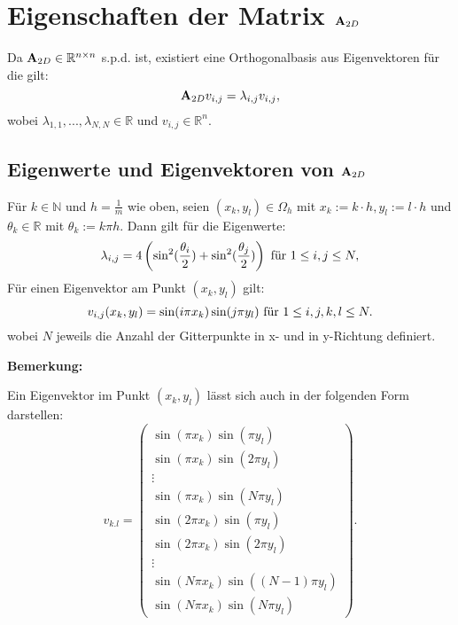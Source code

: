 

\section{Eigenschaften der Matrix ${\textbf{A}}_{2D}$}\label{s.Eigenwerte und Eigenvektoren}

Da ${\textbf{A}}_{2D} \in \mathbb{R}^{n \times n}$ s.p.d. ist, existiert eine Orthogonalbasis aus Eigenvektoren für die gilt:
\begin{equation}
{\textbf{A}}_{2D}v_{i,j} = \lambda_{i,j} v_{i,j},
\end{equation}
wobei $\lambda_{1,1},...,\lambda_{N,N} \in \mathbb{R}$ und $v_{i,j} \in \mathbb{R}^{n}$.

\subsection{Eigenwerte und Eigenvektoren von ${\textbf{A}}_{2D}$}\label{ss.Eigenwerte und Eigenvektoren}

Für $k \in \mathbb{N}$ und $h = \frac {1} {m}$ wie oben, seien $(x_{k},y_{l}) \in \Omega_{h}$ mit $x_{k} := k \cdot h, y_{l} := l \cdot h$ und $\theta_{k} \in \mathbb{R}$ mit $\theta_{k} := k \pi h$. Dann gilt für die Eigenwerte:
\begin{equation}
\lambda_{i,j} = 4 \left(\sin^{2}(\frac {\theta_{i}} {2}) + \sin^{2}(\frac {\theta_{j}} {2}) \right) \textnormal{ für } 1 \le i,j \le N,\label{eq.Eigenwerte}
\end{equation}
Für einen Eigenvektor am Punkt $(x_{k},y_{l})$ gilt:
\begin{equation}
v_{i,j}(x_{k},y_{l}) = \sin(i \pi x_{k}) \sin(j \pi y_{l}) \textnormal{ für } 1 \le i,j,k,l \le N.
\end{equation}
wobei $N$ jeweils die Anzahl der Gitterpunkte in x- und in y-Richtung definiert.

\textbf{Bemerkung:}

Ein Eigenvektor im Punkt $(x_{k},y_{l})$ lässt sich auch in der folgenden Form darstellen:
\begin{equation}
v_{k.l} = 
\begin{pmatrix}
\sin(\pi x_{k})\sin(\pi y_{l})\\
\sin(\pi x_{k})\sin(2 \pi y_{l})\\
\vdots \\
\sin(\pi x_{k})\sin(N \pi y_{l})\\
\sin(2 \pi x_{k})\sin(\pi y_{l})\\
\sin(2 \pi x_{k})\sin(2 \pi y_{l})\\
\vdots\\
\sin(N \pi x_{k})\sin((N-1) \pi y_{l})\\
\sin(N \pi x_{k})\sin(N \pi y_{l})
\end{pmatrix}.
\end{equation}

